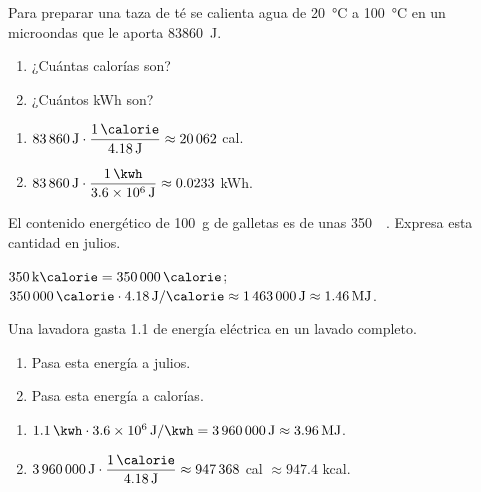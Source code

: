 \begin{exercise}
    Para preparar una taza de té se calienta agua de \qty{20}{\celsius} a \qty{100}{\celsius} en un microondas que le aporta \qty{83860}{\joule}.
    \begin{enumerate}[label=\letraminuscula]
        \item ¿Cuántas calorías son?
        \item ¿Cuántos kWh son?
    \end{enumerate}
    \begin{solu}
        \begin{enumerate}[label=\alph*)]
            \item \(\qty{83860}{\joule} \cdot \dfrac{\qty{1}{\calorie}}{\qty{4.18}{\joule}} \approx \num{20062}\) cal.
            \item \(\qty{83860}{\joule} \cdot \dfrac{\qty{1}{\kwh}}{\qty{3.6e6}{\joule}} \approx \num{0.0233}\) kWh.
        \end{enumerate}
    \end{solu}
\end{exercise}

\begin{exercise}
    El contenido energético de \qty{100}{\g} de galletas es de unas \qty{350}{\kilo\calorie}. Expresa esta cantidad en julios.
    \begin{solu}
        \(\qty{350}{\kilo\calorie} = \qty{350000}{\calorie}\); \(\qty{350000}{\calorie} \cdot \qty{4.18}{\joule\per\calorie} \approx \qty{1463000}{\joule} \approx \qty{1.46}{\mega\joule}\).
    \end{solu}
\end{exercise}

\begin{exercise}
    Una lavadora gasta \qty{1.1}{\kwh} de energía eléctrica en un lavado completo.
    \begin{enumerate}[label=\letraminuscula]
        \item Pasa esta energía a julios.
        \item Pasa esta energía a calorías.
    \end{enumerate}
    \begin{solu}
        \begin{enumerate}[label=\alph*)]
            \item \(\qty{1.1}{\kwh} \cdot \qty{3.6e6}{\joule\per\kwh} = \qty{3960000}{\joule} \approx \qty{3.96}{\mega\joule}\).
            \item \(\qty{3960000}{\joule} \cdot \dfrac{\qty{1}{\calorie}}{\qty{4.18}{\joule}} \approx \num{947368}\) cal \(\approx \num{947.4}\) kcal.
        \end{enumerate}
    \end{solu}
\end{exercise}

